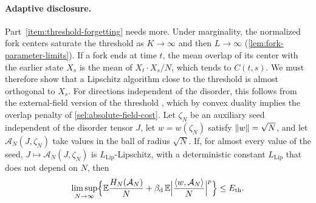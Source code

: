 \paragraph{Adaptive disclosure.}
Part~\ref{item:threshold-forgetting} needs more. Under marginality, the normalized fork centers saturate the threshold as $K\to\infty$ and then $L\to\infty$ (\cref{lem:fork-parameter-limits}). If a fork ends at time $t$, the mean overlap of its center with the earlier state $X_s$ is the mean of $X_t\cdot X_s/N$, which tends to $C(t,s)$. We must therefore show that a Lipschitz algorithm close to the threshold is almost orthogonal to $X_s$. For directions independent of the disorder, this follows from the external-field version of the threshold \cite[Corollary~1.8]{hs2023}, which by convex duality implies the overlap penalty of \cref{sel:absolute-field-cost}. Let $\zeta_N$ be an auxiliary seed independent of the disorder tensor $J$, let $w=w(\zeta_N)$ satisfy $\lVert w\rVert=\sqrt N$, and let $\mathcal A_N(J,\zeta_N)$ take values in the ball of radius $\sqrt N$. If, for almost every value of the seed, $J\mapsto\mathcal A_N(J,\zeta_N)$ is $L_{\mathrm{Lip}}$-Lipschitz, with a deterministic constant $L_{\mathrm{Lip}}$ that does not depend on $N$, then
\[
 \limsup_{N\to\infty}\Bigl\{\mathbb E\frac{H_N(\mathcal A_N)}N+\beta_{\mathrm d}\,\mathbb E\Bigl|\frac{\left\langle w,\mathcal A_N\right\rangle}N\Bigr|^p\Bigr\}\le E_{\mathrm{th}} .
\]
